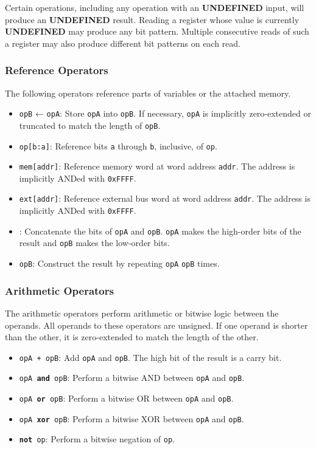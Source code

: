 \documentclass[12pt,a4paper]{article}
\newcommand{\undefined}{\textbf{UNDEFINED}}
\begin{document}
Certain operations, including any operation with an \undefined{} input, will produce an \undefined{} result. Reading a register whose value is currently \undefined{} may produce any bit pattern. Multiple consecutive reads of such a register may also produce different bit patterns on each read.

\subsubsection{Reference Operators}
The following operators reference parts of variables or the attached memory.

\begin{itemize}
  \item \texttt{opB} ← \texttt{opA}: Store \texttt{opA} into \texttt{opB}. If necessary, \texttt{opA} is implicitly zero-extended or truncated to match the length of \texttt{opB}.
  \item \texttt{op[b:a]}: Reference bits \texttt{a} through \texttt{b}, inclusive, of \texttt{op}.
  \item \texttt{mem[addr]}: Reference memory word at word address \texttt{addr}. The address is implicitly ANDed with \texttt{0xFFFF}.
  \item \texttt{ext[addr]}: Reference external bus word at word address \texttt{addr}. The address is implicitly ANDed with \texttt{0xFFFF}.
  \item \texttt{}: Concatenate the bits of \texttt{opA} and \texttt{opB}. \texttt{opA} makes the high-order bits of the result and \texttt{opB} makes the low-order bits.
  \item \texttt{opB}: Construct the result by repeating \texttt{opA} \texttt{opB} times.
\end{itemize}

\subsubsection{Arithmetic Operators}
The arithmetic operators perform arithmetic or bitwise logic between the operands. All operands to these operators are unsigned. If one operand is shorter than the other, it is zero-extended to match the length of the other.

\begin{itemize}
  \item \texttt{opA + opB}: Add \texttt{opA} and \texttt{opB}. The high bit of the result is a carry bit.
  \item \texttt{opA \textbf{and} opB}: Perform a bitwise AND between \texttt{opA} and \texttt{opB}.
  \item \texttt{opA \textbf{or} opB}: Perform a bitwise OR between \texttt{opA} and \texttt{opB}.
  \item \texttt{opA \textbf{xor} opB}: Perform a bitwise XOR between \texttt{opA} and \texttt{opB}.
  \item \texttt{\textbf{not} op}: Perform a bitwise negation of \texttt{op}.
\end{itemize}
\end{document}
